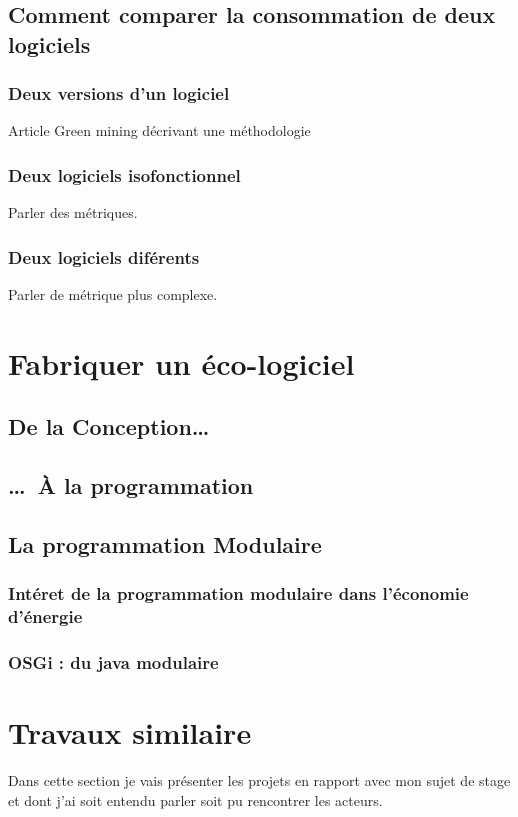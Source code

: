 \documentclass[a4paper, 11pt]{report}
\begin{document}
		\subsection{Comment comparer la consommation de deux logiciels}
			\subsubsection{Deux versions d'un logiciel}
Article Green mining\cite{GreenMining} décrivant une méthodologie

			\subsubsection{Deux logiciels isofonctionnel}
Parler des métriques.

			\subsubsection{Deux logiciels diférents}
Parler de métrique plus complexe.
		
	\section{Fabriquer un éco-logiciel}
		\subsection{De la Conception\ldots}
		
		\subsection{\ldots~À la programmation}
		
		\subsection{La programmation Modulaire}
			\subsubsection{Intéret de la programmation modulaire dans l'économie d'énergie}
			\subsubsection{OSGi : du java modulaire}
		
		
		
	\section{Travaux similaire}
Dans cette section je vais présenter les projets en rapport avec mon sujet de stage et dont j'ai soit entendu parler soit pu rencontrer les acteurs.
\end{document}
